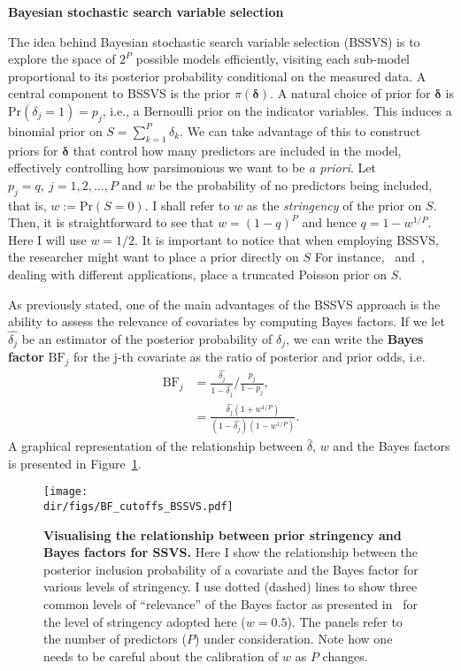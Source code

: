 \textbf{Bayesian stochastic search variable selection}

The idea behind Bayesian stochastic search variable selection (BSSVS) is to explore the space of $2^P$ possible models efficiently, visiting each sub-model proportional to its posterior probability conditional on the measured data.
A central component to BSSVS is the prior $\pi(\boldsymbol\delta)$.
A natural choice of prior for $\boldsymbol\delta$ is $\text{Pr}(\delta_j = 1) = p_j$, i.e., a Bernoulli prior on the indicator variables.
This induces a binomial prior on $S = \sum_{k=1}^P \delta_k$.
We can take advantage of this to construct priors for $\boldsymbol\delta$ that control how many predictors are included in the model, effectively controlling how parsimonious we want to be \textit{a priori}.
Let $p_j = q, \: j = 1, 2, \ldots, P$ and $w$ be the probability of no predictors being included, that is,  $w := \text{Pr}(S = 0)$.
I shall refer to $w$ as the \textit{stringency} of the prior on $S$.
Then, it is straightforward to see that $w = (1-q)^P$ and hence $q = 1 - w^{1/P}$.
Here I will use $w = 1/2$.
It is important to notice that when employing BSSVS, the researcher might want to place a prior directly on $S$
For instance,~\cite{Lemey2009} and~\cite{Drummond2010}, dealing with different applications, place a truncated Poisson prior on $S$.

As previously stated, one of the main advantages of the BSSVS approach is the ability to assess the relevance of covariates by computing Bayes factors.
If we let $\hat{\delta_j}$  be an estimator of the posterior probability of $\delta_j$, we can write the \textbf{Bayes factor}  $\text{BF}_j$ for the j-th covariate as the ratio of posterior and prior odds, i.e.
\begin{align}
 \text{BF}_j &= \frac{\hat{\delta_j} }{1-\hat{\delta_j} }/\frac{p_j}{1-p_j}, \\
  &= \frac{\hat{\delta_j} (1 + w^{1/P})}{(1-\hat{\delta_j})(1 - w^{1/P}) }.
\end{align}
A graphical representation of the relationship between $\hat{\delta}$, $w$ and the Bayes factors is presented in Figure~\ref{fig:BFcalibration}.

\begin{figure}[htbp]
  \centering
  \texttt{[image: \\dir/figs/BF\_cutoffs\_BSSVS.pdf]}
  \caption[Visualising the relationship between prior stringency and Bayes factors for SSVS]{\textbf{Visualising the relationship between prior stringency and Bayes factors for SSVS.}
  Here I show the relationship between the posterior inclusion probability of a covariate and the Bayes factor for various levels of stringency.
  I use dotted (dashed) lines to show three common levels of ``relevance'' of the Bayes factor as presented in~\cite{Kass1995} for the level of stringency adopted here ($w = 0.5$).
  The panels refer to the number of predictors ($P$) under consideration.
  Note how one needs to be careful about the calibration of $w$ as $P$ changes.
  }
  \label{fig:BFcalibration}
\end{figure}

